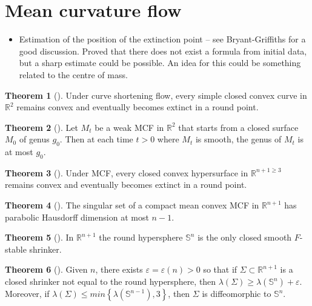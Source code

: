 \documentclass{amsart}
\theoremstyle{definition}
\newtheorem{Thm}{Theorem}[section]
\begin{document}
\newpage 

\section{Mean curvature flow}
\begin{refsection}

\begin{itemize}
\item Estimation of the position of the extinction point -- see Bryant-Griffiths for a good discussion. Proved that there does not exist a formula from initial data, but a sharp estimate could be possible. An idea for this could be something related to the centre of mass.
\end{itemize}

\begin{Thm}[\cite{GageHamilton1986}]
Under curve shortening flow, every simple closed convex curve in ${\mathbb{R}}^{2}$ remains convex and eventually becomes extinct in a round point.
\end{Thm}

\begin{Thm}[\cite{White1995}]
Let ${M}_{t}$ be a weak MCF in ${\mathbb{R}}^{2}$ that starts from a closed surface ${M}_{0}$ of genus $g_0$. Then at each time $t > 0$ where ${M}_{t}$ is smooth, the genus of  ${M}_{t}$ is at most $g_0$.
\end{Thm}

\begin{Thm}[\cite{Huisken1984}]
Under MCF, every closed convex hypersurface in ${\mathbb{R}}^{n+1 \geq 3}$ remains convex and eventually becomes extinct in a round point.
\end{Thm}
 
\begin{Thm}[\cite{White2000}]
The singular set of a compact mean convex MCF in ${\mathbb{R}}^{n+1}$ has parabolic Hausdorff dimension at most $n-1$.
\end{Thm}

\begin{Thm}[\cite{ColdingMinicozzi2012}]
In ${\mathbb{R}}^{n+1}$ the round hypersphere ${\mathbb{S}}^{n}$ is the only closed smooth $F$-stable shrinker.
\end{Thm}

\begin{Thm}[\cite{ColdingIlmanenMinicozziWhite2013}] \label{Colding Ilmanen Minicozzi White 2013}
Given $n$, there exists  $\varepsilon = \varepsilon(n) > 0$ so that if $\Sigma \subset {\mathbb{R}}^{n+1}$
is a closed shrinker not equal to the round hypersphere, then $\lambda\left(\Sigma\right) \geq \lambda\left({\mathbb{S}}^{n}\right) + \varepsilon$. Moreover,
if $\lambda\left(\Sigma\right) \leq min \left\{  \lambda \left({\mathbb{S}}^{n-1}\right) , 3 \right\}$, then $\Sigma$ is diffeomorphic to ${\mathbb{S}}^{n}$.
\end{Thm}
 

\end{refsection}
\end{document}
